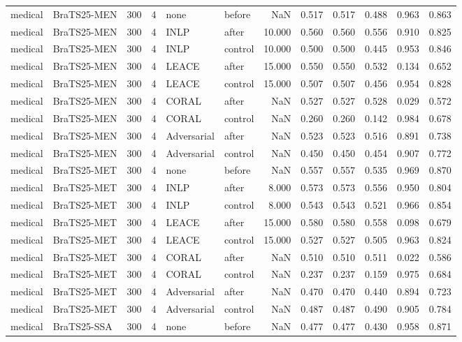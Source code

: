 \begin{tabular}{llrrllrrrrrr}
medical & BraTS25-MEN & 300 & 4 & none & before & NaN & 0.517 & 0.517 & 0.488 & 0.963 & 0.863 \\
medical & BraTS25-MEN & 300 & 4 & INLP & after & 10.000 & 0.560 & 0.560 & 0.556 & 0.910 & 0.825 \\
medical & BraTS25-MEN & 300 & 4 & INLP & control & 10.000 & 0.500 & 0.500 & 0.445 & 0.953 & 0.846 \\
medical & BraTS25-MEN & 300 & 4 & LEACE & after & 15.000 & 0.550 & 0.550 & 0.532 & 0.134 & 0.652 \\
medical & BraTS25-MEN & 300 & 4 & LEACE & control & 15.000 & 0.507 & 0.507 & 0.456 & 0.954 & 0.828 \\
medical & BraTS25-MEN & 300 & 4 & CORAL & after & NaN & 0.527 & 0.527 & 0.528 & 0.029 & 0.572 \\
medical & BraTS25-MEN & 300 & 4 & CORAL & control & NaN & 0.260 & 0.260 & 0.142 & 0.984 & 0.678 \\
medical & BraTS25-MEN & 300 & 4 & Adversarial & after & NaN & 0.523 & 0.523 & 0.516 & 0.891 & 0.738 \\
medical & BraTS25-MEN & 300 & 4 & Adversarial & control & NaN & 0.450 & 0.450 & 0.454 & 0.907 & 0.772 \\
medical & BraTS25-MET & 300 & 4 & none & before & NaN & 0.557 & 0.557 & 0.535 & 0.969 & 0.870 \\
medical & BraTS25-MET & 300 & 4 & INLP & after & 8.000 & 0.573 & 0.573 & 0.556 & 0.950 & 0.804 \\
medical & BraTS25-MET & 300 & 4 & INLP & control & 8.000 & 0.543 & 0.543 & 0.521 & 0.966 & 0.854 \\
medical & BraTS25-MET & 300 & 4 & LEACE & after & 15.000 & 0.580 & 0.580 & 0.558 & 0.098 & 0.679 \\
medical & BraTS25-MET & 300 & 4 & LEACE & control & 15.000 & 0.527 & 0.527 & 0.505 & 0.963 & 0.824 \\
medical & BraTS25-MET & 300 & 4 & CORAL & after & NaN & 0.510 & 0.510 & 0.511 & 0.022 & 0.586 \\
medical & BraTS25-MET & 300 & 4 & CORAL & control & NaN & 0.237 & 0.237 & 0.159 & 0.975 & 0.684 \\
medical & BraTS25-MET & 300 & 4 & Adversarial & after & NaN & 0.470 & 0.470 & 0.440 & 0.894 & 0.723 \\
medical & BraTS25-MET & 300 & 4 & Adversarial & control & NaN & 0.487 & 0.487 & 0.490 & 0.905 & 0.784 \\
medical & BraTS25-SSA & 300 & 4 & none & before & NaN & 0.477 & 0.477 & 0.430 & 0.958 & 0.871 \\

\end{tabular}
